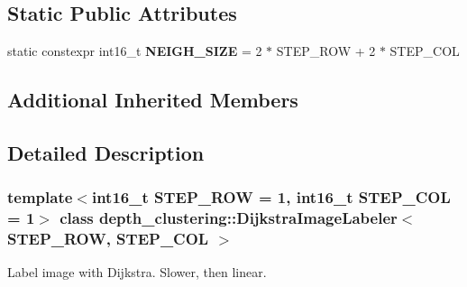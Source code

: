\subsection*{Static Public Attributes}
\begin{DoxyCompactItemize}
\item 
\mbox{\label{classdepth__clustering_1_1DijkstraImageLabeler_a3a1f1c3b1eac8cb71ff04b9d6cc58ea3}} 
static constexpr int16\+\_\+t {\bfseries N\+E\+I\+G\+H\+\_\+\+S\+I\+ZE} = 2 $\ast$ S\+T\+E\+P\+\_\+\+R\+OW + 2 $\ast$ S\+T\+E\+P\+\_\+\+C\+OL
\end{DoxyCompactItemize}
\subsection*{Additional Inherited Members}


\subsection{Detailed Description}
\subsubsection*{template$<$int16\+\_\+t S\+T\+E\+P\+\_\+\+R\+OW = 1, int16\+\_\+t S\+T\+E\+P\+\_\+\+C\+OL = 1$>$\newline
class depth\+\_\+clustering\+::\+Dijkstra\+Image\+Labeler$<$ S\+T\+E\+P\+\_\+\+R\+O\+W, S\+T\+E\+P\+\_\+\+C\+O\+L $>$}

Label image with Dijkstra. Slower, then linear. 

